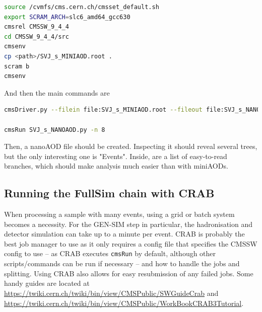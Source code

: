 \begin{lstlisting}[belowskip=-0.7cm, language=sh, numbers=none]
source /cvmfs/cms.cern.ch/cmsset_default.sh
export SCRAM_ARCH=slc6_amd64_gcc630
cmsrel CMSSW_9_4_4
cd CMSSW_9_4_4/src
cmsenv
cp <path>/SVJ_s_MINIAOD.root .
scram b
cmsenv
\end{lstlisting}

And then the main commands are

\begin{lstlisting}[belowskip=-0.7cm, language=sh, numbers=none]
cmsDriver.py --filein file:SVJ_s_MINIAOD.root --fileout file:SVJ_s_NANOAOD.root --mc --eventcontent NANOAODSIM --datatier NANOAODSIM --conditions auto:run2_mc -s NANO --era Run2_2016,run2_miniAOD_80XLegacy --python_filename SVJ_s_NANOAOD.py --no_exec -n 250

cmsRun SVJ_s_NANOAOD.py -n 8
\end{lstlisting}

Then, a nanoAOD file should be created. Inspecting it should reveal several trees, but the only interesting one is "Events". Inside, are a list of easy-to-read branches, which should make analysis much easier than with miniAODs.


\subsection{Running the FullSim chain with CRAB}

When processing a sample with many events, using a grid or batch system becomes a necessity. For the GEN-SIM step in particular, the hadronisation and detector simulation can take up to a minute per event. CRAB is probably the best job manager to use as it only requires a config file that specifies the CMSSW config to use -- as CRAB executes \texttt{cmsRun} by default, although other scripts/commands can be run if necessary -- and how to handle the jobs and splitting. Using CRAB also allows for easy resubmission of any failed jobs. Some handy guides are located at \url{https://twiki.cern.ch/twiki/bin/view/CMSPublic/SWGuideCrab} and \url{https://twiki.cern.ch/twiki/bin/view/CMSPublic/WorkBookCRAB3Tutorial}.

